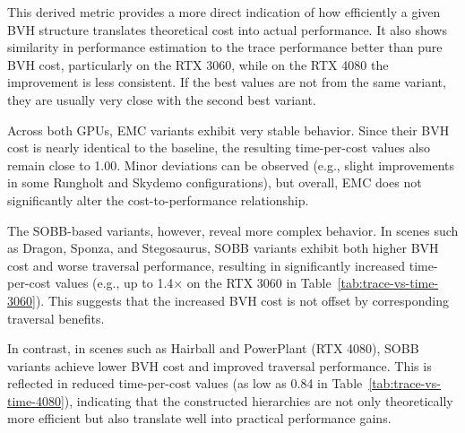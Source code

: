 This derived metric provides a more direct indication of how efficiently a given BVH structure translates theoretical cost into actual performance. It also shows similarity in performance estimation to the trace performance better than pure BVH cost, particularly on the RTX 3060, while on the RTX 4080 the improvement is less consistent. If the best values are not from the same variant, they are usually very close with the second best variant.

Across both GPUs, EMC variants exhibit very stable behavior. Since their BVH cost is nearly identical to the baseline, the resulting time-per-cost values also remain close to 1.00. Minor deviations can be observed (e.g., slight improvements in some Rungholt and Skydemo configurations), but overall, EMC does not significantly alter the cost-to-performance relationship.

The SOBB-based variants, however, reveal more complex behavior. In scenes such as Dragon, Sponza, and Stegosaurus, SOBB variants exhibit both higher BVH cost and worse traversal performance, resulting in significantly increased time-per-cost values (e.g., up to 1.4× on the RTX 3060 in Table~\ref{tab:trace-vs-time-3060}). This suggests that the increased BVH cost is not offset by corresponding traversal benefits.

In contrast, in scenes such as Hairball and PowerPlant (RTX 4080), SOBB variants achieve lower BVH cost and improved traversal performance. This is reflected in reduced time-per-cost values (as low as 0.84 in Table~\ref{tab:trace-vs-time-4080}), indicating that the constructed hierarchies are not only theoretically more efficient but also translate well into practical performance gains.

